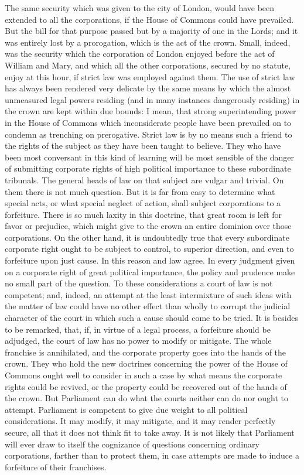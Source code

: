 {The same security which was given to the city of London, would have been extended to all the corporations, if the House of Commons could have prevailed. But the bill for that purpose passed but by a majority of one in the Lords; and it was entirely lost by a prorogation, which is the act of the crown. Small, indeed, was the security which the corporation of London enjoyed before the act of William and Mary, and which all the other corporations, secured by no statute, enjoy at this hour, if strict law was employed against them. The use of strict law has always been rendered very delicate by the same means by which the almost unmeasured legal powers residing (and in many instances dangerously residing) in the crown are kept within due bounds: I mean, that strong superintending power in the House of Commons which inconsiderate people have been prevailed on to condemn as trenching on prerogative. Strict law is by no means such a friend to the rights of the subject as they have been taught to believe. They who have been most conversant in this kind of learning will be most sensible of the danger of submitting corporate rights of high political importance to these subordinate tribunals. The general heads of law on that subject are vulgar and trivial. On them there is not much question. But it is far from easy to determine what special acts, or what special neglect of action, shall subject corporations to a forfeiture. There is so much laxity in this doctrine, that great room is left for favor or prejudice, which might give to the crown an entire dominion over those corporations. On the other hand, it is undoubtedly true that every subordinate corporate right ought to be subject to control, to superior direction, and even to forfeiture upon just cause. In this reason and law agree. In every judgment given on a corporate right of great political importance, the policy and prudence make no small part of the question. To these considerations a court of law is not competent; and, indeed, an attempt at the least intermixture of such ideas with the matter of law could have no other effect than wholly to corrupt the judicial character of the court in which such a cause should come to be tried. It is besides to be remarked, that, if, in virtue of a legal process, a forfeiture should be adjudged, the court of law has no power to modify or mitigate. The whole franchise is annihilated, and the corporate property goes into the hands of the crown. They who hold the new doctrines concerning the power of the House of Commons ought well to consider in such a case by what means the corporate rights could be revived, or the property could be recovered out of the hands of the crown. But Parliament can do what the courts neither can do nor ought to attempt. Parliament is competent to give due weight to all political considerations. It may modify, it may mitigate, and it may render perfectly secure, all that it does not think fit to take away. It is not likely that Parliament will ever draw to itself the cognizance of questions concerning ordinary corporations, farther than to protect them, in case attempts are made to induce a forfeiture of their franchises.

}
